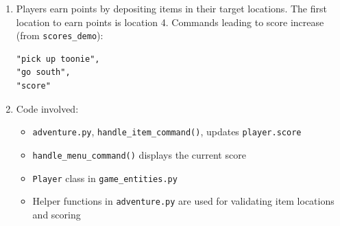 \documentclass[11pt]{article}
\begin{document}
\begin{enumerate}
    \item Players earn points by depositing items in their target locations. The first location to earn points is location 4. Commands leading to score increase (from \texttt{scores\_demo}):
\begin{verbatim}
"pick up toonie",
"go south",
"score"
\end{verbatim}

    \item Code involved:
    \begin{itemize}
        \item \texttt{adventure.py}, \texttt{handle\_item\_command()}, updates \texttt{player.score}
        \item \texttt{handle\_menu\_command()} displays the current score
        \item \texttt{Player} class in \texttt{game\_entities.py}
        \item Helper functions in \texttt{adventure.py} are used for validating item locations and scoring
    \end{itemize}
\end{enumerate}
\end{document}
